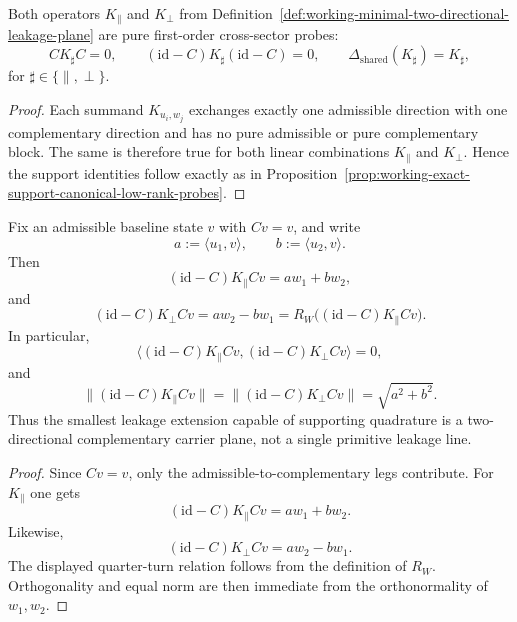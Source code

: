 \begin{proposition}
\label{prop:working-exact-support-minimal-two-directional-class}
Both operators $K_{\parallel}$ and $K_{\perp}$ from Definition~\ref{def:working-minimal-two-directional-leakage-plane} are pure first-order cross-sector probes:
\[
 CK_{\sharp}C=0,
 \qquad
 (\mathrm{id}-C)K_{\sharp}(\mathrm{id}-C)=0,
 \qquad
 \Delta_{\mathrm{shared}}(K_{\sharp})=K_{\sharp},
\]
for $\sharp\in\{\parallel,\perp\}$.
\end{proposition}

\begin{proof}
Each summand $K_{u_i,w_j}$ exchanges exactly one admissible direction with one complementary direction and has no pure admissible or pure complementary block. The same is therefore true for both linear combinations $K_{\parallel}$ and $K_{\perp}$. Hence the support identities follow exactly as in Proposition~\ref{prop:working-exact-support-canonical-low-rank-probes}.
\end{proof}

\begin{proposition}
\label{prop:working-complementary-output-geometry-minimal-two-directional-class}
Fix an admissible baseline state $v$ with $Cv=v$, and write
\[
 a:=\langle u_1,v\rangle,
 \qquad
 b:=\langle u_2,v\rangle.
\]
Then
\[
 (\mathrm{id}-C)K_{\parallel}Cv = a w_1 + b w_2,
\]
and
\[
 (\mathrm{id}-C)K_{\perp}Cv = a w_2 - b w_1 = R_W\bigl((\mathrm{id}-C)K_{\parallel}Cv\bigr).
\]
In particular,
\[
 \bigl\langle (\mathrm{id}-C)K_{\parallel}Cv,(\mathrm{id}-C)K_{\perp}Cv\bigr\rangle = 0,
\]
and
\[
 \bigl\|(\mathrm{id}-C)K_{\parallel}Cv\bigr\| = \bigl\|(\mathrm{id}-C)K_{\perp}Cv\bigr\| = \sqrt{a^2+b^2}.
\]
Thus the smallest leakage extension capable of supporting quadrature is a two-directional complementary carrier plane, not a single primitive leakage line.
\end{proposition}

\begin{proof}
Since $Cv=v$, only the admissible-to-complementary legs contribute. For $K_{\parallel}$ one gets
\[
 (\mathrm{id}-C)K_{\parallel}Cv = a w_1 + b w_2.
\]
Likewise,
\[
 (\mathrm{id}-C)K_{\perp}Cv = a w_2 - b w_1.
\]
The displayed quarter-turn relation follows from the definition of $R_W$. Orthogonality and equal norm are then immediate from the orthonormality of $w_1,w_2$.
\end{proof}

